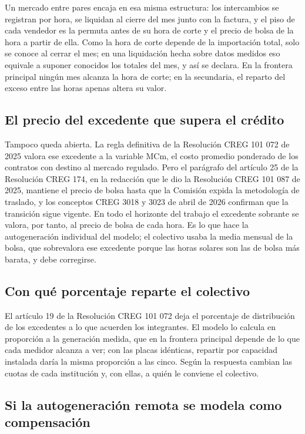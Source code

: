 Un mercado entre pares encaja en esa misma estructura: los intercambios se
registran por hora, se liquidan al cierre del mes junto con la factura, y el
piso de cada vendedor es la permuta antes de su hora de corte y el precio de
bolsa de la hora a partir de ella. Como la hora de corte depende de la
importación total, solo se conoce al cerrar el mes; en una liquidación hecha
sobre datos medidos eso equivale a suponer conocidos los totales del mes, y
así se declara. En la frontera principal ningún mes alcanza la hora de corte;
en la secundaria, el reparto del exceso entre las horas apenas altera su
valor.

\subsection{El precio del excedente que supera el crédito}
\label{sub:preg-mcm}

Tampoco queda abierta. La regla definitiva de la Resolución CREG 101 072 de
2025 valora ese excedente a la variable MCm, el costo promedio ponderado de los
contratos con destino al mercado regulado. Pero el parágrafo del artículo 25
de la Resolución CREG 174, en la redacción que le dio la Resolución CREG 101 087
de 2025, mantiene el precio de bolsa hasta que la Comisión expida la
metodología de traslado, y los conceptos CREG 3018 y 3023 de abril de 2026
confirman que la transición sigue vigente. En todo el horizonte del trabajo el
excedente sobrante se valora, por tanto, al precio de bolsa de cada hora. Es lo
que hace la autogeneración individual del modelo; el colectivo usaba la media
mensual de la bolsa, que sobrevalora ese excedente porque las horas solares son
las de bolsa más barata, y debe corregirse.

\subsection{Con qué porcentaje reparte el colectivo}
\label{sub:preg-pde}

El artículo 19 de la Resolución CREG 101 072 deja el porcentaje de
distribución de los excedentes a lo que acuerden los integrantes. El modelo
lo calcula en proporción a la generación medida, que en la frontera
principal depende de lo que cada medidor alcanza a ver; con las placas
idénticas, repartir por capacidad instalada daría la misma proporción a las
cinco. Según la respuesta cambian las cuotas de cada institución y, con
ellas, a quién le conviene el colectivo.

\subsection{Si la autogeneración remota se modela como compensación}
\label{sub:preg-agr}

